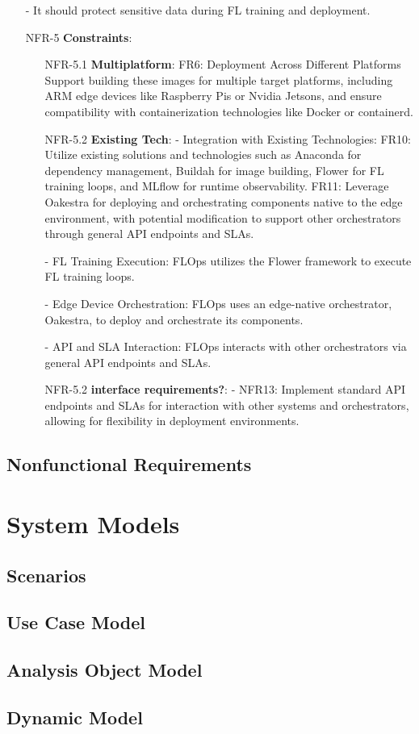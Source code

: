 \begin{itemize}
        - It should protect sensitive data during FL training and deployment.
    \item [NFR-5] {\textbf{Constraints}}: %
        \begin{itemize}
            \item [NFR-5.1] {\textbf{Multiplatform}}:
                FR6: Deployment Across Different Platforms
                Support building these images for multiple target platforms, including ARM edge devices like Raspberry Pis or Nvidia Jetsons,
                and ensure compatibility with containerization technologies like Docker or containerd.
            \item [NFR-5.2] {\textbf{Existing Tech}}: %
                - Integration with Existing Technologies:
                    FR10: Utilize existing solutions and technologies such as Anaconda for dependency management, Buildah for image building, Flower for FL training loops, and MLflow for runtime observability.
                    FR11: Leverage Oakestra for deploying and orchestrating components native to the edge environment, with potential modification to support other orchestrators through general API endpoints and SLAs.

                - FL Training Execution:
                    FLOps utilizes the Flower framework to execute FL training loops.

                - Edge Device Orchestration:
                    FLOps uses an edge-native orchestrator, Oakestra, to deploy and orchestrate its components.

                - API and SLA Interaction:
                    FLOps interacts with other orchestrators via general API endpoints and SLAs.
            \item [NFR-5.2] {\textbf{interface requirements?}}:
                - NFR13: Implement standard API endpoints and SLAs for interaction with other systems and orchestrators, allowing for flexibility in deployment environments.
        \end{itemize}
\end{itemize}


\subsection{Nonfunctional Requirements}

\section{System Models}
\subsection{Scenarios}
\subsection{Use Case Model}
\subsection{Analysis Object Model}
\subsection{Dynamic Model}
